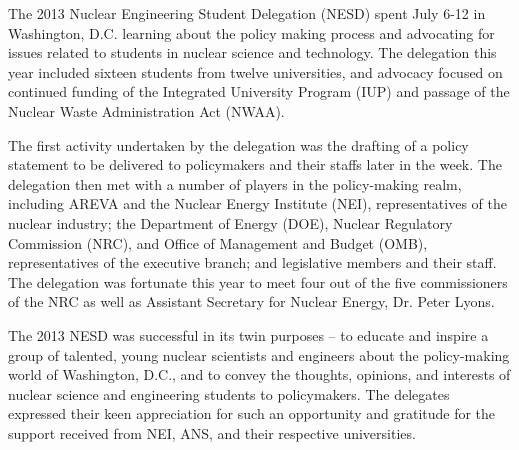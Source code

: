 The 2013 Nuclear Engineering Student Delegation (NESD) spent July 6-12 in
Washington, D.C. learning about the policy making process and advocating for
issues related to students in nuclear science and technology. The delegation
this year included sixteen students from twelve universities, and advocacy
focused on continued funding of the Integrated University Program (IUP) and
passage of the Nuclear Waste Administration Act (NWAA).

The first activity undertaken by the delegation was the drafting of a policy
statement to be delivered to policymakers and their staffs later in the
week. The delegation then met with a number of players in the policy-making
realm, including AREVA and the Nuclear Energy Institute (NEI), representatives
of the nuclear industry; the Department of Energy (DOE), Nuclear Regulatory
Commission (NRC), and Office of Management and Budget (OMB), representatives of
the executive branch; and legislative members and their staff. The delegation
was fortunate this year to meet four out of the five commissioners of the NRC as
well as Assistant Secretary for Nuclear Energy, Dr. Peter Lyons.

The 2013 NESD was successful in its twin purposes -- to educate and inspire a
group of talented, young nuclear scientists and engineers about the
policy-making world of Washington, D.C., and to convey the thoughts, opinions,
and interests of nuclear science and engineering students to policymakers. The
delegates expressed their keen appreciation for such an opportunity and
gratitude for the support received from NEI, ANS, and their respective
universities.
